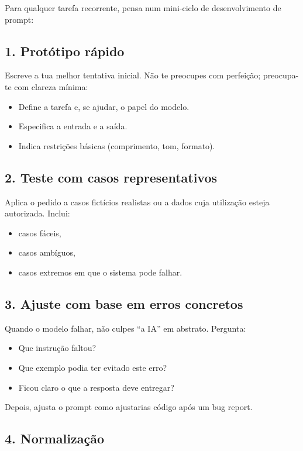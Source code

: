 Para qualquer tarefa recorrente, pensa num mini-ciclo de desenvolvimento de prompt:

\subsection*{1. Protótipo rápido}

Escreve a tua melhor tentativa inicial. Não te preocupes com perfeição; preocupa-te com clareza mínima:

\begin{itemize}[leftmargin=*]
\item Define a tarefa e, se ajudar, o papel do modelo.
\item Especifica a entrada e a saída.
\item Indica restrições básicas (comprimento, tom, formato).
\end{itemize}

\subsection*{2. Teste com casos representativos}

Aplica o pedido a casos fictícios realistas ou a dados cuja utilização esteja autorizada. Inclui:

\begin{itemize}[leftmargin=*]
\item casos fáceis,
\item casos ambíguos,
\item casos extremos em que o sistema pode falhar.
\end{itemize}

\subsection*{3. Ajuste com base em erros concretos}

Quando o modelo falhar, não culpes “a IA” em abstrato. Pergunta:

\begin{itemize}[leftmargin=*]
\item Que instrução faltou?
\item Que exemplo podia ter evitado este erro?
\item Ficou claro o que a resposta deve entregar?
\end{itemize}

Depois, ajusta o prompt como ajustarias código após um bug report.

\subsection*{4. Normalização}

